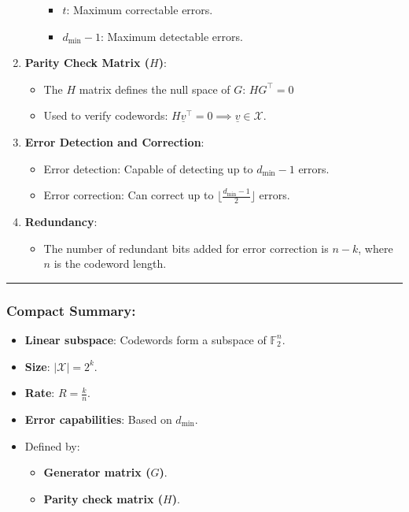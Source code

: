 \documentclass[11pt]{article}
\providecommand{\tightlist}{%
      \setlength{\itemsep}{0pt}\setlength{\parskip}{0pt}}
\begin{document}
\begin{enumerate}
\begin{itemize}
    \begin{itemize}
    \tightlist
    \item
      \(t\): Maximum correctable errors.
    \item
      \(d_\text{min} - 1\): Maximum detectable errors.
    \end{itemize}
  \end{itemize}
\item
  \textbf{Parity Check Matrix (\(H\))}:

  \begin{itemize}
  \tightlist
  \item
    The \(H\) matrix defines the null space of \(G\): \(H G^\top = 0\)
  \item
    Used to verify codewords:
    \(H \underline{v}^\top = 0 \implies \underline{v} \in \mathcal{X}.\)
  \end{itemize}
\item
  \textbf{Error Detection and Correction}:

  \begin{itemize}
  \tightlist
  \item
    Error detection: Capable of detecting up to \(d_\text{min} - 1\)
    errors.
  \item
    Error correction: Can correct up to
    \(\lfloor \frac{d_\text{min} - 1}{2} \rfloor\) errors.
  \end{itemize}
\item
  \textbf{Redundancy}:

  \begin{itemize}
  \tightlist
  \item
    The number of redundant bits added for error correction is
    \(n - k\), where \(n\) is the codeword length.
  \end{itemize}
\end{enumerate}

\begin{center}\rule{0.5\linewidth}{0.5pt}\end{center}

\subsubsection{Compact Summary:}\label{compact-summary}

\begin{itemize}
\tightlist
\item
  \textbf{Linear subspace}: Codewords form a subspace of
  \(\mathbb{F}_2^n\).
\item
  \textbf{Size}: \(|\mathcal{X}| = 2^k\).
\item
  \textbf{Rate}: \(R = \frac{k}{n}\).
\item
  \textbf{Error capabilities}: Based on \(d_\text{min}\).
\item
  Defined by:

  \begin{itemize}
  \tightlist
  \item
    \textbf{Generator matrix (\(G\))}.
  \item
    \textbf{Parity check matrix (\(H\))}.
  \end{itemize}
\end{itemize}
\end{document}

